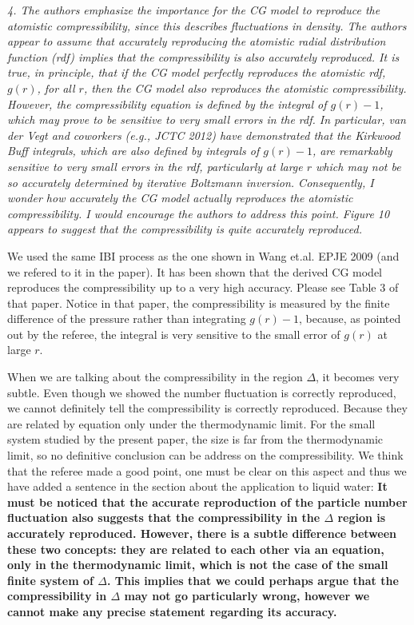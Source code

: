 \documentclass[a4paper]{article}
\begin{document}
\textit{
4. The authors emphasize the importance for the CG model to reproduce
the atomistic compressibility, since this describes fluctuations in
density. The authors appear to assume that accurately reproducing the
atomistic radial distribution function (rdf) implies that the
compressibility is also accurately reproduced. It is true, in
principle, that if the CG model perfectly reproduces the atomistic
rdf, $g(r)$, for all $r$, then the CG model also reproduces the atomistic
compressibility. However, the compressibility equation is defined by
the integral of $g(r)-1$, which may prove to be sensitive to very
small errors in the rdf. In particular, van der Vegt and coworkers
(e.g., JCTC 2012) have demonstrated that the Kirkwood Buff integrals,
which are also defined by integrals of $g(r)-1$, are remarkably
sensitive to very small errors in the rdf, particularly at large $r$
which may not be so accurately determined by iterative Boltzmann
inversion. Consequently, I wonder how accurately the CG model actually
reproduces the atomistic compressibility. I would encourage the
authors to address this point. Figure 10 appears to suggest that the
compressibility is quite accurately reproduced.
}

We used the same IBI process as the one shown in Wang et.al. EPJE
2009 (and we refered to it in the paper).  It has been shown that the derived CG model reproduces the
compressibility up to a very high accuracy. Please see Table 3 of that
paper.
Notice in that paper, the compressibility is measured by the
finite  difference of the pressure rather than integrating $g(r)-1$,
because, as pointed out by the referee, the integral is very sensitive
to the small error of $g(r)$ at large $r$.

When we are talking about the compressibility in the region $\Delta$,
it becomes very subtle. Even though we showed the number fluctuation
is correctly reproduced, we cannot definitely tell the compressibility
is correctly reproduced. Because they are related by equation only
under the thermodynamic limit.  For the small system studied by the
present paper, the size is far from the thermodynamic limit, so no
definitive conclusion can be address on the compressibility.
We think that the referee made a good point, one must be clear on this aspect and thus we have added a sentence in the section about the application to liquid water: {\bf It must be noticed that the accurate reproduction of the particle number fluctuation also suggests that the compressibility in the $\Delta$ region is accurately reproduced. However, there is a subtle difference between these two concepts: they are related to each other via an equation, only in the thermodynamic limit, which is not the case of the small finite system of $\Delta$. This implies that we could perhaps argue that the compressibility in $\Delta$ may not go particularly wrong, however we cannot make any precise statement regarding its accuracy.}
\\
\end{document}

